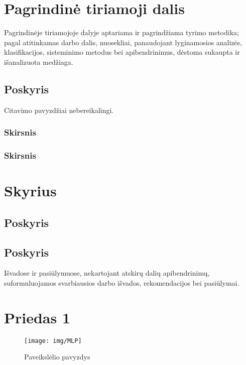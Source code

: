 \documentclass{VUMIFInfKursinis}
\begin{document}


\section{Pagrindinė tiriamoji dalis}
Pagrindinėje tiriamojoje dalyje aptariama ir pagrindžiama tyrimo metodika;
pagal atitinkamas darbo dalis, nuosekliai, panaudojant lyginamosios analizės,
klasifikacijos, sisteminimo metodus bei apibendrinimus, dėstoma sukaupta ir
išanalizuota medžiaga.

\subsection{Poskyris}
Citavimo pavyzdžiai nebereikalingi.

\subsubsection{Skirsnis}
\subsubsection{Skirsnis}
\section{Skyrius}
\subsection{Poskyris}
\subsection{Poskyris}

Išvadose ir pasiūlymuose, nekartojant atskirų dalių apibendrinimų,
suformuluojamos svarbiausios darbo išvados, rekomendacijos bei pasiūlymai.

\printbibliography[heading=bibintoc] %

\appendix  %

\section{Priedas 1}
\begin{figure}[H]
    \centering
    \texttt{[image: img/MLP]}
    \caption{Paveikslėlio pavyzdys}   %
    \label{img:mlp}
\end{figure}
\end{document}
